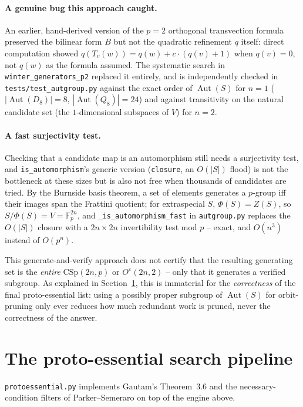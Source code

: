 \documentclass[11pt]{article}
\theoremstyle{remark}
\begin{document}
\paragraph{A genuine bug this approach caught.} An earlier, hand-derived
version of the $p=2$ orthogonal transvection formula preserved the bilinear
form $B$ but not the quadratic refinement $q$ itself: direct computation
showed $q(T_v(w)) = q(w) + c\cdot(q(v)+1)$ when $q(v)=0$, not $q(w)$ as the
formula assumed. The systematic search in
\texttt{winter\_generators\_p2} replaced it entirely, and is independently
checked in \texttt{tests/test\_autgroup.py} against the exact order of
$\operatorname{Aut}(S)$ for $n=1$ ($|\operatorname{Aut}(D_8)|=8$,
$|\operatorname{Aut}(Q_8)|=24$) and against transitivity on the natural
candidate set (the $1$-dimensional subspaces of $V$) for $n=2$.
\label{sec:p2bug}

\paragraph{A fast surjectivity test.} Checking that a candidate map is an
automorphism still needs a surjectivity test, and \texttt{is\_automorphism}'s
generic version (\texttt{closure}, an $O(|S|)$ flood) is not the bottleneck
at these sizes but is also not free when thousands of candidates are tried.
By the Burnside basis theorem, a set of elements generates a $p$-group iff
their images span the Frattini quotient; for extraspecial $S$,
$\Phi(S) = Z(S)$, so $S/\Phi(S) = V = \mathbb{F}_p^{2n}$, and
\texttt{\_is\_automorphism\_fast} in \texttt{autgroup.py} replaces the
$O(|S|)$ closure with a $2n \times 2n$ invertibility test mod $p$ -- exact,
and $O(n^3)$ instead of $O(p^n)$.

This generate-and-verify approach does not certify that the resulting
generating set is the \emph{entire} $\mathrm{CSp}(2n,p)$ or
$O^{\varepsilon}(2n,2)$ -- only that it generates a verified subgroup. As
explained in Section~\ref{sec:pipeline}, this is immaterial for the
\emph{correctness} of the final proto-essential list: using a possibly
proper subgroup of $\operatorname{Aut}(S)$ for orbit-pruning only ever
reduces how much redundant work is pruned, never the correctness of the
answer.

\section{The proto-essential search pipeline}
\label{sec:pipeline}

\texttt{protoessential.py} implements Gautam's Theorem~3.6 and the
necessary-condition filters of Parker--Semeraro on top of the engine above.
\end{document}

